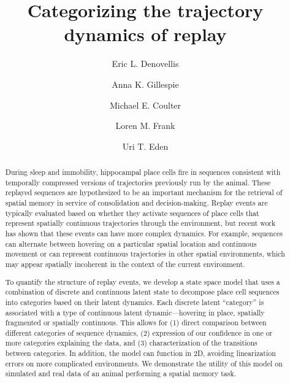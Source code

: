 \documentclass[times, twoside, watermark]{zHenriquesLab-StyleBioRxiv}
\begin{document}
\title{Categorizing the trajectory dynamics of replay}

\author[1,\Letter]{Eric L. Denovellis}
\author[2, 3]{Anna K. Gillespie}
\author[2, 3]{Michael E. Coulter}
\author[2, 3, 4]{Loren M. Frank}
\author[1]{Uri T. Eden}


\maketitle

\begin{abstract}
During sleep and immobility, hippocampal place cells fire in sequences consistent with temporally compressed versions of trajectories previously run by the animal. These replayed sequences are hypothesized to be an important mechanism for the retrieval of spatial memory in service of consolidation and decision-making. Replay events are typically evaluated based on whether they activate sequences of place cells that represent spatially continuous trajectories through the environment, but recent work has shown that these events can have more complex dynamics. For example, sequences can alternate between hovering on a particular spatial location and continuous movement or can represent continuous trajectories in other spatial environments, which may appear spatially incoherent in the context of the current environment.\newline

To quantify the structure of replay events, we develop a state space model that uses a combination of discrete and continuous latent state to decompose place cell sequences into categories based on their latent dynamics. Each discrete latent “category” is associated with a type of continuous latent dynamic—hovering in place, spatially fragmented or spatially continuous. This allows for (1) direct comparison between different categories of sequence dynamics, (2) expression of our confidence in one or more categories explaining the data, and (3) characterization of the transitions between categories. In addition, the model can function in 2D, avoiding linearization errors on more complicated environments. We demonstrate the utility of this model on simulated and real data of an animal performing a spatial memory task.

\end {abstract}
\end{document}
